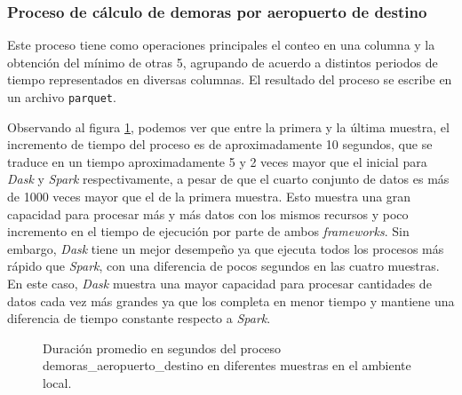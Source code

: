 \subsubsection{Proceso de cálculo de demoras por aeropuerto de destino}

Este proceso tiene como operaciones principales el conteo en una columna y la obtención del mínimo de otras 5, agrupando de acuerdo a distintos periodos de tiempo representados en diversas columnas. El resultado del proceso se escribe en un archivo \texttt{parquet}.

Observando al figura \ref{lineas:local-demoras-aeropuerto-destino}, podemos ver que entre la primera y la última muestra, el incremento de tiempo del proceso es de aproximadamente 10 segundos, que se traduce en un tiempo aproximadamente 5 y 2 veces mayor que el inicial para \textit{Dask} y \textit{Spark} respectivamente, a pesar de que el cuarto conjunto de datos es más de 1000 veces mayor que el de la primera muestra. Esto muestra una gran capacidad para procesar más y más datos con los mismos recursos y poco incremento en el tiempo de ejecución por parte de ambos \textit{frameworks}.  Sin embargo, \textit{Dask} tiene un mejor desempeño ya que ejecuta todos los procesos más rápido que \textit{Spark}, con una diferencia de pocos segundos en las cuatro muestras. En este caso, \textit{Dask} muestra una mayor capacidad para procesar cantidades de datos cada vez más grandes ya que los completa en menor tiempo y mantiene una diferencia de tiempo constante respecto a \textit{Spark}.

\begin{figure}
\centering
{}
\caption{Duración promedio en segundos del proceso demoras\_aeropuerto\_destino en diferentes muestras en el ambiente local.}
\label{lineas:local-demoras-aeropuerto-destino}
\end{figure}

